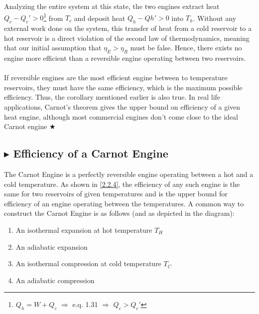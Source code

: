 \noindent Analyzing the entire system at this state, the two engines extract heat $Q_c - Q_c' > 0$\footnote{$Q_h = W + Q_c$ $\Rightarrow$ e.q. 1.31 $\Rightarrow$ $Q_c > Q_c'$} from $T_c$ and deposit heat $Q_h - Qh' > 0$ into $T_h$. Without any external work done on the system, this transfer of heat from a cold reservoir to a hot reservoir is a direct violation of the second law of thermodynamics, meaning that our initial assumption that $\eta_E > \eta_R$ must be false. Hence, there exists no engine more efficient than a reversible engine operating between two reservoirs. \\
\\
If reversible engines are the most efficient engine between to temperature reservoirs, they must have the same efficiency, which is the maximum possible efficiency. Thus, the corollary mentioned earlier is also true. In real life applications, Carnot's theorem gives the upper bound on efficiency of a given heat engine, although most commercial engines don't come close to the ideal Carnot engine $\bigstar$


%
%
\subsection{\color{Orchid} $\blacktriangleright$ \color{black} Efficiency of a Carnot Engine}\label{2.2.5}
The Carnot Engine is a perfectly reversible engine operating between a hot and a cold temperature. As shown in \ref{2.2.4}, the efficiency of any such engine is the same for two reservoirs of given temperatures and is the upper bound for efficiency of an engine operating between the temperatures. A common way to construct the Carnot Engine is as follows (and as depicted in the diagram):
\begin{enumerate}
    \item An isothermal expansion at hot temperature $T_H$
    \item An adiabatic expansion 
    \item An isothermal compression at cold temperature $T_C$
    \item An adiabatic compression
\end{enumerate}

